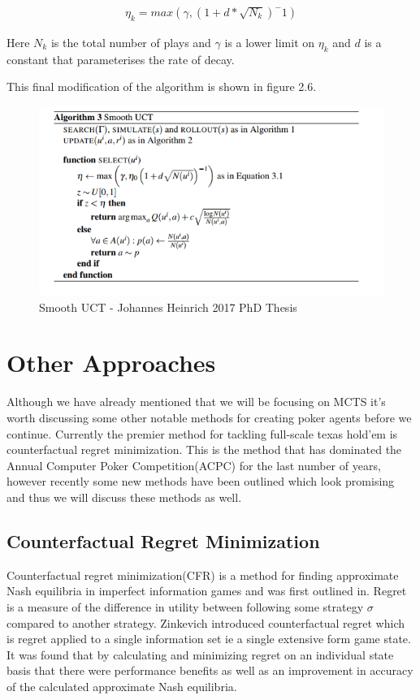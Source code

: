 \begin{align}
\eta_k = max(\gamma, (1 + d * \sqrt{N_k})^-1)
\end{align}

Here $N_k$ is the total number of plays and $\gamma$ is a lower limit on $\eta_k$ 
and $d$ is a constant that parameterises the rate of decay.

This final modification of the algorithm is shown in figure 2.6.

\begin{figure}[!ht]
    \includegraphics[scale=.6]{images/smooth_uct.png}
    \caption{Smooth UCT - Johannes Heinrich 2017 PhD Thesis}
\end{figure}
 

\section{Other Approaches}\label{sec:thImplementations}
Although we have already mentioned that we will be focusing on MCTS
it's worth discussing some other notable methods for creating poker 
agents before we continue.
Currently the premier method for tackling full-scale texas hold'em is counterfactual 
regret minimization.
This is the method that has dominated the Annual Computer Poker Competition(ACPC) for the 
last number of years, however recently some new methods have been outlined 
which look promising and thus we will discuss these methods as well.


\subsection{Counterfactual Regret Minimization}\label{subsec:thCFR}
Counterfactual regret minimization(CFR) is a method for finding approximate Nash
equilibria in imperfect information games and was first outlined in\citep{zinkevich2008regret}.
Regret is a measure of the difference in utility between following some strategy 
$\sigma$ compared to another strategy.
Zinkevich introduced counterfactual regret which is regret applied to a 
single information set ie a single extensive form game state.
It was found that by calculating and minimizing regret on an individual
state basis that there were performance benefits as well as an improvement 
in accuracy of the calculated approximate Nash equilibria.

